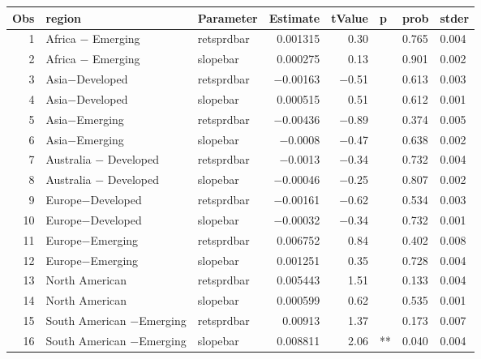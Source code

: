 

\begin{longtable}{|r|l|l|r|r|l|l|l|}\hline
   Obs &    region &    Parameter &    Estimate &    tValue &    p &    prob &    stder\\\hline
\endhead
   1 &    Africa $-$ Emerging &    retsprdbar &    0.001315 &    0.30 &      &    0.765 &    0.004\\\hline
   2 &    Africa $-$ Emerging &    slopebar &    0.000275 &    0.13 &      &    0.901 &    0.002\\\hline
   3 &    Asia$-$Developed &    retsprdbar &    $-$0.00163 &    $-$0.51 &      &    0.613 &    0.003\\\hline
   4 &    Asia$-$Developed &    slopebar &    0.000515 &    0.51 &      &    0.612 &    0.001\\\hline
   5 &    Asia$-$Emerging &    retsprdbar &    $-$0.00436 &    $-$0.89 &      &    0.374 &    0.005\\\hline
   6 &    Asia$-$Emerging &    slopebar &    $-$0.0008 &    $-$0.47 &      &    0.638 &    0.002\\\hline
   7 &    Australia $-$ Developed &    retsprdbar &    $-$0.0013 &    $-$0.34 &      &    0.732 &    0.004\\\hline
   8 &    Australia $-$ Developed &    slopebar &    $-$0.00046 &    $-$0.25 &      &    0.807 &    0.002\\\hline
   9 &    Europe$-$Developed &    retsprdbar &    $-$0.00161 &    $-$0.62 &      &    0.534 &    0.003\\\hline
   10 &    Europe$-$Developed &    slopebar &    $-$0.00032 &    $-$0.34 &      &    0.732 &    0.001\\\hline
   11 &    Europe$-$Emerging &    retsprdbar &    0.006752 &    0.84 &      &    0.402 &    0.008\\\hline
   12 &    Europe$-$Emerging &    slopebar &    0.001251 &    0.35 &      &    0.728 &    0.004\\\hline
   13 &    North American &    retsprdbar &    0.005443 &    1.51 &      &    0.133 &    0.004\\\hline
   14 &    North American &    slopebar &    0.000599 &    0.62 &      &    0.535 &    0.001\\\hline
   15 &    South American $-$Emerging &    retsprdbar &    0.00913 &    1.37 &      &    0.173 &    0.007\\\hline
   16 &    South American $-$Emerging &    slopebar &    0.008811 &    2.06 &    ** &    0.040 &    0.004\\\hline
\end{longtable}


